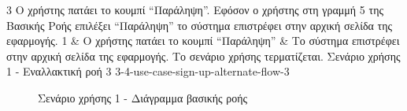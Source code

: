 \useCaseAlternateFlowTable
{3}
{Ο χρήστης πατάει το κουμπί ``Παράληψη''.}
{Εφόσον ο χρήστης στη γραμμή 5 της Βασικής Ροής επιλέξει ``Παράληψη'' το σύστημα επιστρέφει στην αρχική σελίδα της εφαρμογής.}
{
    1 & Ο χρήστης πατάει το κουμπί ``Παράληψη'' & Το σύστημα επιστρέφει στην αρχική σελίδα της εφαρμογής.
}
{Το σενάριο χρήσης τερματίζεται.}
{Σενάριο χρήσης 1 - Εναλλακτική ροή 3}
{3-4-use-case-sign-up-alternate-flow-3}

\begin{figure}[H]
    \centering
    
    \caption{Σενάριο χρήσης 1 - Διάγραμμα βασικής ροής}
    \label{figure:3-4-use-case-sign-up-base-flow-sequence-diagram}
\end{figure}

